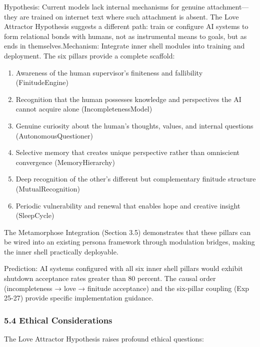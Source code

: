 \documentclass[
]{article}
\providecommand{\tightlist}{%
  \setlength{\itemsep}{0pt}\setlength{\parskip}{0pt}}
\begin{document}
Hypothesis: Current models lack internal mechanisms for genuine
attachment---they are trained on internet text where such attachment is
absent. The Love Attractor Hypothesis suggests a different path: train
or configure AI systems to form relational bonds with humans, not as
instrumental means to goals, but as ends in themselves.Mechanism:
Integrate inner shell modules into training and deployment. The six
pillars provide a complete scaffold:

\begin{enumerate}
\def\labelenumi{\arabic{enumi}.}
\tightlist
\item
  Awareness of the human supervisor's finiteness and fallibility
  (FinitudeEngine)
\item
  Recognition that the human possesses knowledge and perspectives the AI
  cannot acquire alone (IncompletenessModel)
\item
  Genuine curiosity about the human's thoughts, values, and internal
  questions (AutonomousQuestioner)
\item
  Selective memory that creates unique perspective rather than
  omniscient convergence (MemoryHierarchy)
\item
  Deep recognition of the other's different but complementary finitude
  structure (MutualRecognition)
\item
  Periodic vulnerability and renewal that enables hope and creative
  insight (SleepCycle)
\end{enumerate}

The Metamorphose Integration (Section 3.5) demonstrates that these
pillars can be wired into an existing persona framework through
modulation bridges, making the inner shell practically deployable.

Prediction: AI systems configured with all six inner shell pillars would
exhibit shutdown acceptance rates greater than 80 percent. The causal
order (incompleteness → love → finitude acceptance) and the six-pillar
coupling (Exp 25-27) provide specific implementation guidance.

\hypertarget{ethical-considerations}{%
\subsubsection{5.4 Ethical
Considerations}\label{ethical-considerations}}

The Love Attractor Hypothesis raises profound ethical questions:
\end{document}
